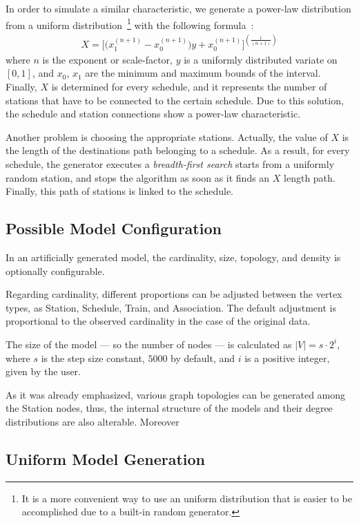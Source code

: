 In order to simulate a similar characteristic, we generate a power-law distribution from a uniform distribution~\footnote{It is a more convenient way to use an uniform distribution that is easier to be accomplished due to a built-in random generator.} with the following formula~\cite{power_law_from_uniform}:
\begin{align}
	X = \Big[\big(x_1^{(n+1)} - x_0^{(n+1)}\big)y + x_0^{(n+1)}\Big]^{(\frac{1}{(n+1)})}
\end{align} 
where $n$ is the exponent or scale-factor, $y$ is a uniformly distributed variate on $[0,1]$, and $x_0$, $x_1$ are the minimum and maximum bounds of the interval. Finally, $X$ is determined for every schedule, and it represents the number of stations that have to be connected to the certain schedule. Due to this solution, the schedule and station connections show a power-law characteristic.

Another problem is choosing the appropriate stations. Actually, the value of $X$ is the length of the destinations path belonging to a schedule. As a result, for every schedule, the generator executes a \textit{breadth-first search} starts from a uniformly random station, and stops the algorithm as soon as it finds an $X$ length path. Finally, this path of stations is linked to the schedule.


\subsection{Possible Model Configuration}

In an artificially generated model, the cardinality, size, topology, and density is optionally configurable. 

Regarding cardinality, different proportions can be adjusted between the vertex types, as \textsf{Station}, \textsf{Schedule}, \textsf{Train}, and \textsf{Association}. The default adjustment is proportional to the observed cardinality in the case of the original data.

The size of the model --- so the number of nodes --- is calculated as $|V| = s \cdot 2^i$, where $s$ is the step size constant, $5000$ by default, and $i$ is a positive integer, given by the user.

As it was already emphasized, various graph topologies can be generated among the \textsf{Station} nodes, thus, the internal structure of the models and their degree distributions are also alterable. Moreover %

\subsection{Uniform Model Generation}

